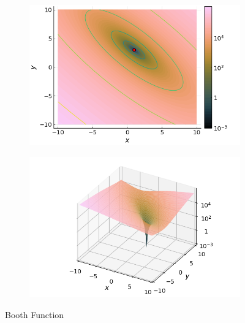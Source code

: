   \begin{figure}[ht!]
    \centering
    \begin{subfigure}[b]{0.45\textwidth}
      \centering
      \includegraphics[width=\textwidth]{img/test_functions/booth_contour.png}
    \end{subfigure}
    \hfill
    \begin{subfigure}[b]{0.45\textwidth}
      \centering
      \includegraphics[width=\textwidth]{img/test_functions/booth_surface.png}
    \end{subfigure}
    \caption{Booth Function}
    \label{fig:app:test:booth}
  \end{figure}
